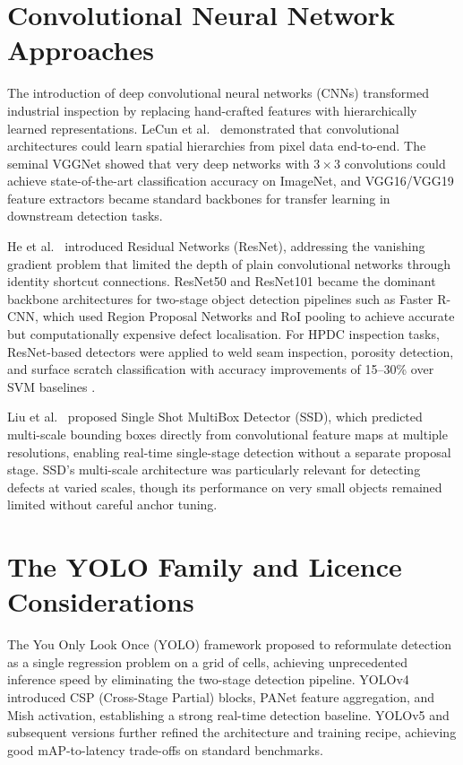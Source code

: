 \section{Convolutional Neural Network Approaches}

The introduction of deep convolutional neural networks (CNNs) transformed industrial inspection by replacing hand-crafted features with hierarchically learned representations. LeCun et al.\ \cite{lecun1998} demonstrated that convolutional architectures could learn spatial hierarchies from pixel data end-to-end. The seminal VGGNet \cite{simonyan2014} showed that very deep networks with $3\times3$ convolutions could achieve state-of-the-art classification accuracy on ImageNet, and VGG16/VGG19 feature extractors became standard backbones for transfer learning in downstream detection tasks.

He et al.\ \cite{he2016} introduced Residual Networks (ResNet), addressing the vanishing gradient problem that limited the depth of plain convolutional networks through identity shortcut connections. ResNet50 and ResNet101 became the dominant backbone architectures for two-stage object detection pipelines such as Faster R-CNN, which used Region Proposal Networks and RoI pooling to achieve accurate but computationally expensive defect localisation. For HPDC inspection tasks, ResNet-based detectors were applied to weld seam inspection, porosity detection, and surface scratch classification with accuracy improvements of 15--30\% over SVM baselines \cite{he2016}.

Liu et al.\ \cite{liu2016} proposed Single Shot MultiBox Detector (SSD), which predicted multi-scale bounding boxes directly from convolutional feature maps at multiple resolutions, enabling real-time single-stage detection without a separate proposal stage. SSD's multi-scale architecture was particularly relevant for detecting defects at varied scales, though its performance on very small objects remained limited without careful anchor tuning.

\section{The YOLO Family and Licence Considerations}

The You Only Look Once (YOLO) \cite{redmon2016} framework proposed to reformulate detection as a single regression problem on a grid of cells, achieving unprecedented inference speed by eliminating the two-stage detection pipeline. YOLOv4 \cite{bochkovskiy2020} introduced CSP (Cross-Stage Partial) blocks, PANet feature aggregation, and Mish activation, establishing a strong real-time detection baseline. YOLOv5 and subsequent versions further refined the architecture and training recipe, achieving good mAP-to-latency trade-offs on standard benchmarks.

